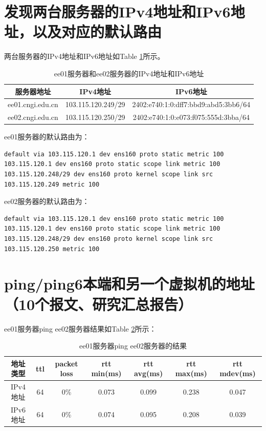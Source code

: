 \documentclass[12pt,letterpaper]{article}
\begin{document}
\section{发现两台服务器的IPv4地址和IPv6地址，以及对应的默认路由}
两台服务器的IPv4地址和IPv6地址如Table \ref{tab1}所示。
\begin{table}[!h]
	\centering
	\caption{\label{tab1}ee01服务器和ee02服务器的IPv4地址和IPv6地址}
	\begin{tabular}{|c|c|c|}
		\hline
		服务器地址 & IPv4地址 & IPv6地址 \\
		\hline
		ee01.cngi.edu.cn & 103.115.120.249/29 & 2402:e740:1:0:dff7:bbd9:abd5:3bb6/64\\
		\hline
		ee02.cngi.edu.cn & 103.115.120.250/29 & 2402:e740:1:0:e073:f075:555d:3bba/64\\
		\hline
	\end{tabular}
\end{table}

ee01服务器的默认路由为：
\begin{lstlisting}
default via 103.115.120.1 dev ens160 proto static metric 100 
103.115.120.1 dev ens160 proto static scope link metric 100 
103.115.120.248/29 dev ens160 proto kernel scope link src 103.115.120.249 metric 100 
\end{lstlisting}

ee02服务器的默认路由为：
\begin{lstlisting}
default via 103.115.120.1 dev ens160 proto static metric 100 
103.115.120.1 dev ens160 proto static scope link metric 100 
103.115.120.248/29 dev ens160 proto kernel scope link src 103.115.120.250 metric 100
\end{lstlisting}

\section{ping/ping6本端和另一个虚拟机的地址（10个报文、研究汇总报告）}
ee01服务器ping ee02服务器结果如Table \ref{tab2}所示：

\begin{table}[!h]
	\centering
	\caption{\label{tab2}ee01服务器ping ee02服务器的结果}
	\begin{tabular}{|c|c|c|c|c|c|c|}
		\hline
		地址类型 & ttl & packet loss & rtt min(ms) & rtt avg(ms) & rtt max(ms) & rtt mdev(ms) \\
		\hline
		IPv4地址 & 64 & 0\% & 0.073 & 0.099 & 0.238 & 0.047\\
		\hline
		IPv6地址 & 64 & 0\% & 0.074 & 0.095 & 0.208 & 0.039\\
		\hline
	\end{tabular}
\end{table}
\end{document}
